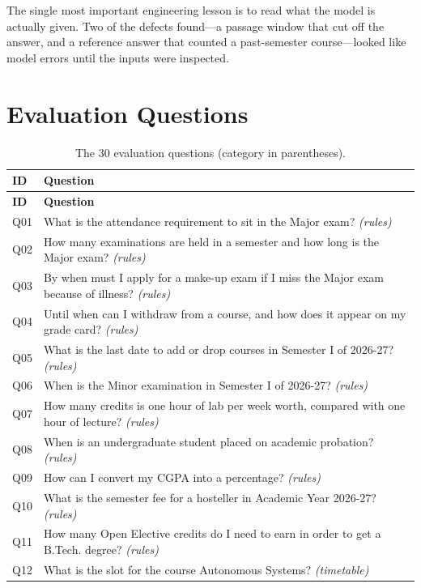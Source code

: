 \documentclass[10pt,a4paper]{article}
\begin{document}
The single most important engineering lesson is to read what the model is actually given. Two of the defects found---a passage window that cut off the answer, and a reference answer that counted a past-semester course---looked like model errors until the inputs were inspected.

\appendix
\section{Evaluation Questions}
\begin{longtable}{@{}>{\ttfamily}l p{}@{}}
\caption{The 30 evaluation questions (category in parentheses).}\\
\toprule
\textbf{ID} & \textbf{Question}\\
\midrule
\endfirsthead
\toprule
\textbf{ID} & \textbf{Question}\\
\midrule
\endhead
Q01 & What is the attendance requirement to sit in the Major exam? \textit{(rules)}\\
Q02 & How many examinations are held in a semester and how long is the Major exam? \textit{(rules)}\\
Q03 & By when must I apply for a make-up exam if I miss the Major exam because of illness? \textit{(rules)}\\
Q04 & Until when can I withdraw from a course, and how does it appear on my grade card? \textit{(rules)}\\
Q05 & What is the last date to add or drop courses in Semester I of 2026-27? \textit{(rules)}\\
Q06 & When is the Minor examination in Semester I of 2026-27? \textit{(rules)}\\
Q07 & How many credits is one hour of lab per week worth, compared with one hour of lecture? \textit{(rules)}\\
Q08 & When is an undergraduate student placed on academic probation? \textit{(rules)}\\
Q09 & How can I convert my CGPA into a percentage? \textit{(rules)}\\
Q10 & What is the semester fee for a hosteller in Academic Year 2026-27? \textit{(rules)}\\
Q11 & How many Open Elective credits do I need to earn in order to get a B.Tech. degree? \textit{(rules)}\\
Q12 & What is the slot for the course Autonomous Systems? \textit{(timetable)}\\

\end{longtable}
\end{document}
